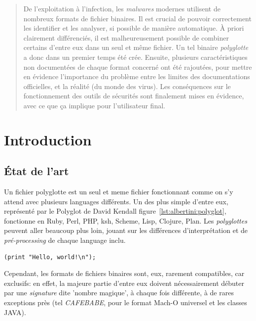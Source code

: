 



\maketitle
{}

\begin{abstract}
De l'exploitation à l'infection, les {\it malwares} modernes utilisent de nombreux formats de fichier binaires.
Il est crucial de pouvoir correctement les identifier et les analyser, si possible de manière automatique.
À priori clairement différenciés, il est malheureusement possible de combiner certains d'entre eux dans un seul et même fichier.
Un tel binaire {\it polyglotte} a donc dans un premier temps été crée. 
Ensuite, plusieurs caractéristiques non documentées de chaque format concerné ont été rajoutées, pour mettre en évidence l'importance du problème entre les limites des documentations officielles, et la réalité (du monde des virus).
Les conséquences sur le fonctionnement des outils de sécurités sont finalement mises en évidence, avec ce que ça implique pour l'utilisateur final.
\end{abstract}


\section{Introduction}

\subsection{État de l'art}

Un fichier polyglotte est un seul et meme fichier fonctionnant comme on s'y attend avec plusieurs languages différents.  Un des plus simple d'entre eux, représenté par le Polyglot de David Kendall figure~\ref{lst:albertini:polyglot}, fonctionne en Ruby, Perl, PHP, ksh, Scheme, Lisp, Clojure, Plan. Les {\it polyglottes} peuvent aller beaucoup plus loin, jouant sur les différences d'interprétation et de {\it pré-processing} de chaque language inclu.

\begin{lstlisting}[language={},caption={un programme polyglotte simple},label={lst:albertini:polyglot}]
 (print "Hello, world!\n");
\end{lstlisting}
Cependant, les formats de fichiers binaires sont, eux, rarement compatibles, car exclusifs: en effet, la majeure partie d'entre eux doivent nécessairement débuter par une {\it signature} dite 'nombre magique', à chaque fois différente, à de rares exceptions près (tel {\em CAFEBABE}, pour le format Mach-O universel et les classes JAVA).

